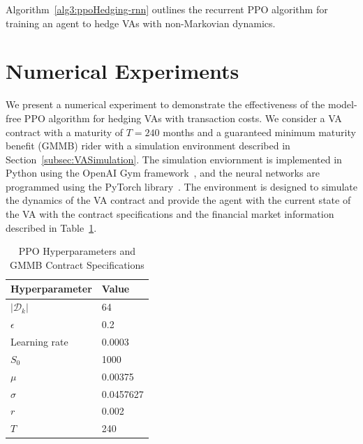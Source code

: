 Algorithm~\ref{alg3:ppoHedging-rnn} outlines the recurrent PPO algorithm for training an agent to hedge VAs with non-Markovian dynamics.

\section{Numerical Experiments}

We present a numerical experiment to demonstrate the effectiveness of the model-free PPO algorithm for hedging VAs with transaction costs.
We consider a VA contract with a maturity of $T=240$ months and a guaranteed minimum maturity benefit (GMMB) rider with a simulation environment described in Section~\ref{subsec:VASimulation}.
The simulation enviornment is implemented in Python using the OpenAI Gym framework~\citep{brockman2016openai}, and the neural networks are programmed using the PyTorch library~\citep{paszke2019pytorch}.
The environment is designed to simulate the dynamics of the VA contract and provide the agent with the current state of the VA with the contract specifications and the financial market information described in Table~\ref{tab3:hyperparameters}.

\begin{table}[ht!]
    \centering
    \begin{tabular}{ll} 
        \toprule
        Hyperparameter      & Value \\
        \midrule
        $|\mathcal{D}_k|$   & 64        \\
        $\epsilon$          & 0.2       \\
        Learning rate       & 0.0003    \\
        $S_0$               & 1000      \\
        $\mu$               & 0.00375   \\
        $\sigma$            & 0.0457627 \\
        $r$                 & 0.002     \\
        $T$                 & 240       \\
        \bottomrule
    \end{tabular}
    \caption{PPO Hyperparameters and GMMB Contract Specifications} 
    \label{tab3:hyperparameters}
\end{table}

